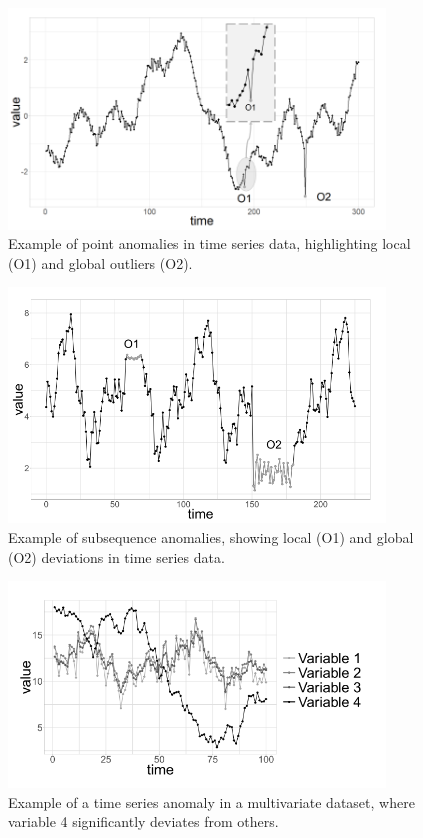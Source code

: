 \begin{figure}[H]
    \centering
    \includegraphics[width=10cm]{Cap2_LitReview/point_anomaly.png}
    \caption{Example of point anomalies in time series data, highlighting local (O1) and global outliers (O2). \cite{Blazquez-Garcia_Conde_Mori_Lozano_2021}}
    \label{fig:point_anomaly}
\end{figure}

\begin{figure}[H]
    \centering
    \includegraphics[width=10cm]{Cap2_LitReview/subseq_anomaly.png}
    \caption{Example of subsequence anomalies, showing local (O1) and global (O2) deviations in time series data. \cite{Blazquez-Garcia_Conde_Mori_Lozano_2021}}
    \label{fig:subsequence_anomaly}
\end{figure}

\begin{figure}[H]
    \centering
    \includegraphics[width=10cm]{Cap2_LitReview/TS_anomaly.png}
    \caption{Example of a time series anomaly in a multivariate dataset, where variable 4 significantly deviates from others. \cite{Blazquez-Garcia_Conde_Mori_Lozano_2021}}
    \label{fig:Time_series_anomaly}
\end{figure}

